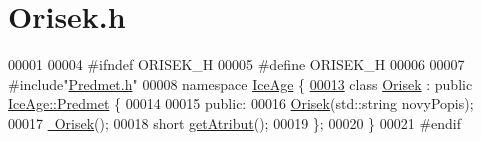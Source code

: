 \hypertarget{Orisek_8h_source}{}\section{Orisek.\+h}
\label{Orisek_8h_source}

\begin{DoxyCode}
00001 
00004 \textcolor{preprocessor}{#ifndef ORISEK\_H}
00005 \textcolor{preprocessor}{#define ORISEK\_H}
00006 
00007 \textcolor{preprocessor}{#include"\hyperlink{Predmet_8h}{Predmet.h}"}
00008 \textcolor{keyword}{namespace }\hyperlink{namespaceIceAge}{IceAge} \{
\hypertarget{Orisek_8h_source.tex_l00013}{}\hyperlink{classIceAge_1_1Orisek}{00013}     \textcolor{keyword}{class }\hyperlink{classIceAge_1_1Orisek}{Orisek} : \textcolor{keyword}{public} \hyperlink{classIceAge_1_1Predmet}{IceAge::Predmet} \{
00014 
00015     \textcolor{keyword}{public}:
00016         \hyperlink{classIceAge_1_1Orisek_ab01a1d98a4f04839d1110b14335f9007}{Orisek}(std::string novyPopis);
00017         \hyperlink{classIceAge_1_1Orisek_a4180472fce3b7381d49244fd76954d95}{~Orisek}();
00018          \textcolor{keywordtype}{short} \hyperlink{classIceAge_1_1Orisek_aee44e1de3168d98f5da635476ffd9560}{getAtribut}();
00019     \};
00020 \}
00021 \textcolor{preprocessor}{#endif}
\end{DoxyCode}

